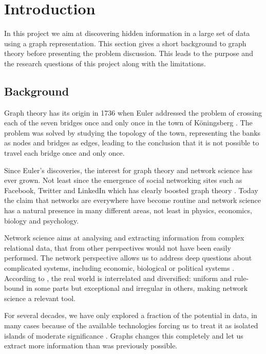 \chapter{Introduction}
In this project we aim at discovering hidden information in a large set of data using a graph representation. This section gives a short background to graph theory before presenting the problem discussion. This leads to the purpose and the research questions of this project along with the limitations. 

\section{Background}
Graph theory has its origin in 1736 when Euler addressed the problem of crossing each of the seven bridges once and only once in the town of Köningsberg \cite{fouss2016algorithms}. The problem was solved by studying the topology of the town, representing the banks as nodes and bridges as edges, leading to the conclusion that it is not possible to travel each bridge once and only once.

Since Euler's discoveries, the interest for graph theory and network science has ever grown. Not least since the emergence of social networking sites such as Facebook, Twitter and LinkedIn which has clearly boosted graph theory \cite{fouss2016algorithms,barabasi2016network}. Today the claim that networks are everywhere have become routine \cite{brandes2013} and network science has a natural presence in many different areas, not least in physics, economics, biology and psychology.

Network science aims at analysing and extracting information from complex relational data, that from other perspectives would not have been easily performed. The network perspective allows us to address deep questions about complicated systems, including economic, biological or political systems \cite{brandes2013}. According to \citet{robinson2013}, the real world is interrelated and diversified: uniform and rule-bound in some parts but exceptional and irregular in others, making network science a relevant tool.

For several decades, we have only explored a fraction of the potential in data, in many cases because of the available technologies forcing us to treat it as isolated islands of moderate significance \cite{robinson2013}. Graphs changes this completely and let us extract more information than was previously possible.


